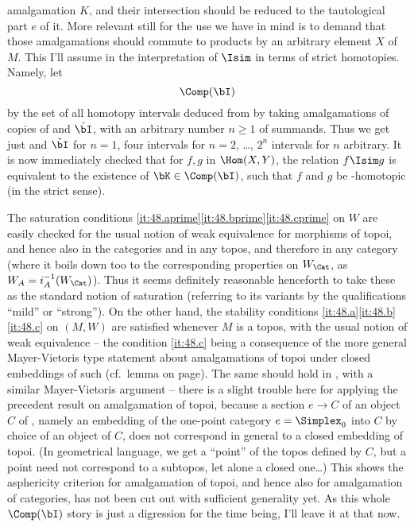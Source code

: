 amalgamation $K$, and their intersection should be reduced to the
tautological part $e$ of it. More relevant still for the use we have
in mind is to demand that those amalgamations should commute to
products by an arbitrary element $X$ of $M$. This I'll
assume in the interpretation of $\Isim$ in terms of strict
homotopies. Namely, let
\[\Comp(\bI)\]
by the set of all homotopy intervals deduced from \bI{} by taking
amalgamations of copies of \bI{} and $\check\bI$, with an arbitrary
number $n\ge1$ of summands. Thus we get just \bI{} and $\check\bI$ for
$n=1$, four intervals for $n=2$, \ldots, $2^n$ intervals for $n$
arbitrary. It is now immediately checked that for $f,g$ in
$\Hom(X,Y)$, the relation $f\Isim g$ is equivalent to the existence of
$\bK\in\Comp(\bI)$, such that $f$ and $g$ be \bK-homotopic (in the
strict sense).

\begin{remark}
  The saturation conditions
  \ref{it:48.aprime}\ref{it:48.bprime}\ref{it:48.cprime} on $W$ are
  easily checked for the usual notion of weak equivalence for
  morphisms of topoi, and hence also in the categories \Cat{} and in
  any topos, and therefore in any category \Ahat{} (where it boils
  down too to the corresponding properties on $W_\Cat$, as
  $W_A=i_A^{-1}(W_\Cat)$). Thus it seems definitely reasonable
  henceforth to take these as the standard notion of saturation
  (referring to its variants by the qualifications ``mild'' or
  ``strong''). On the other hand, the stability conditions
  \ref{it:48.a}\ref{it:48.b}\ref{it:48.c} on $(M,W)$ are satisfied
  whenever $M$ is a topos, with the usual notion of weak equivalence
  -- the condition \ref{it:48.c} being a consequence of the more
  general Mayer-Vietoris type statement about amalgamations of topoi
  under closed embeddings of such (cf.\ lemma on page). The same
  should hold in \Cat, with a similar Mayer-Vietoris argument -- there
  is a slight trouble here for applying the precedent result on
  amalgamation of topoi, because a section $e\to C$ of an object $C$
  of \Cat, namely an embedding of the one-point category $e=\Simplex_0$
  into $C$ by choice of an object of $C$, does not correspond in
  general to a closed embedding of topoi. (In geometrical language, we
  get a ``point'' of the topos \Chat{} defined by $C$, but a point
  need not correspond to a subtopos, let alone a closed one\ldots)
  This shows the asphericity criterion for amalgamation of topoi, and
  hence also for amalgamation of categories, has not been cut out with
  sufficient generality yet. As this whole $\Comp(\bI)$ story is just
  a digression for the time being, I'll leave it at that now.
\end{remark}

